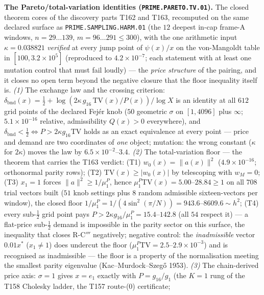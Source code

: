 \par\smallskip\noindent\textbf{The Pareto/total-variation identities
(\texttt{PRIME.PARETO.TV.01}).}
The closed theorem cores of the discovery parts T162 and T163,
recomputed on the same declared surface as
\texttt{PRIME.SAMPLING.HARM.01} (the $12$ deepest in-cap frame-A
windows, $n=29\ldots139$, $m=96\ldots291\le300$), with the one
arithmetic input $\kappa=0.038821$ \emph{verified} at every jump point
of $\psi(x)/x$ on the von-Mangoldt table in $[100,3.2\times10^{5}]$
(reproduced to $4.2\times10^{-7}$; each statement with at least one
mutation control that must fail loudly) --- the \emph{price structure}
of the pairing, and it closes no open term beyond the negative closure
that the floor inequality itself is. \emph{(1)} The exchange law and
the crossing criterion:
$\delta_{\mathrm{bnd}}(x)=\tfrac12+\log(2\kappa\,g_{16}\,
\mathrm{TV}(x)/P(x))/\log X$ is an identity at all $612$ grid points of
the declared Fej\'er knob ($50$ geometric $\sigma$ on $[1,4096]$ plus
$\infty$; $5.1\times10^{-16}$ relative, admissibility $Q(x)>0$
everywhere), and $\delta_{\mathrm{bnd}}<\tfrac12\iff
P>2\kappa g_{16}\mathrm{TV}$ holds as an exact equivalence at every
point --- price and demand are two coordinates of \emph{one} object;
mutation: the wrong constant ($\kappa$ for $2\kappa$) moves the law by
$6.5\times10^{-2}$--$3.4$. \emph{(2)} The total-variation floor --- the
theorem that carries the T163 verdict: (T1) $w_0(x)=\|a(x)\|^2$
($4.9\times10^{-16}$; orthonormal parity rows); (T2)
$\mathrm{TV}(x)\ge|w_0(x)|$ by telescoping with $w_M=0$; (T3) $x_1=1$
forces $\|a\|^2\ge1/\mu^P_1$, hence
$\mu^P_1\mathrm{TV}(x)=5.00$--$28.84\ge1$ on all $708$ trial vectors
built ($51$ knob settings plus $8$ random admissible sixteen-vectors
per window), the closed floor
$1/\mu^P_1=1/(4\sin^2(\pi/N))=943.6$--$8609.6\sim h^2$; (T4) every
sub-$\tfrac12$ grid point pays
$P>2\kappa g_{16}/\mu^P_1=15.4$--$142.8$ (all $54$ respect it) --- a
flat-price sub-$\tfrac12$ demand is impossible in the parity sector on
this surface, the inequality that closes R-C$'''$ negatively; negative
control: the \emph{inadmissible} vector $0.01x^*$ ($x_1\ne1$) does
undercut the floor ($\mu^P_1\mathrm{TV}=2.5$--$2.9\times10^{-3}$) and
is recognised as inadmissible --- the floor is a property of the
normalisation meeting the smallest parity eigenvalue
(Kac--Murdock--Szeg\H{o} 1953). \emph{(3)} The chain-derived price
axis: $\sigma=1$ gives $x=e_1$ exactly with $P=g_{16}/g_1$ (the $K=1$
rung of the T158 Cholesky ladder, the T157 route-(0) certificate;
